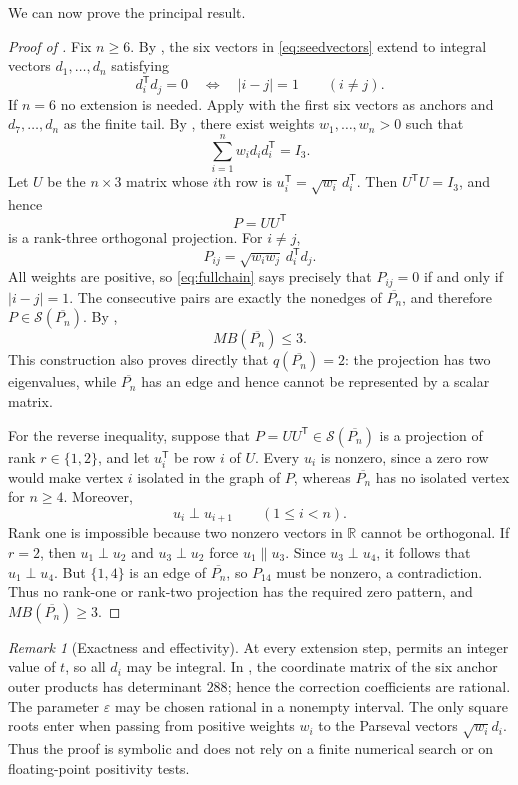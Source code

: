 \documentclass[11pt]{article}
\theoremstyle{remark}
\newtheorem{remark}[theorem]{Remark}
\newcommand{\R}{\mathbb{R}}
\newcommand{\cS}{\mathcal{S}}
\begin{document}
We can now prove the principal result.

\begin{proof}[Proof of ]
Fix $n\ge6$.  By , the six vectors in
\eqref{eq:seedvectors} extend to integral vectors
$d_1,\ldots,d_n$ satisfying
\[
 d_i^{\mathsf T}d_j=0
 \quad\Longleftrightarrow\quad |i-j|=1
 \qquad(i\ne j).
\tag{4.6}\label{eq:fullchain}
\]
If $n=6$ no extension is needed.  Apply  with the first
six vectors as anchors and $d_7,\ldots,d_n$ as the finite tail.  By
, there exist weights $w_1,\ldots,w_n>0$ such that
\[
                 \sum_{i=1}^n w_i d_i d_i^{\mathsf T}=I_3.
\tag{4.7}\label{eq:fullparseval}
\]
Let $U$ be the $n\times3$ matrix whose $i$th row is
$u_i^{\mathsf T}=\sqrt{w_i}\,d_i^{\mathsf T}$.  Then
$U^{\mathsf T}U=I_3$, and hence
\[
                  P=UU^{\mathsf T}
\]
is a rank-three orthogonal projection.  For $i\ne j$,
\[
 P_{ij}=\sqrt{w_iw_j}\,d_i^{\mathsf T}d_j.
\]
All weights are positive, so \eqref{eq:fullchain} says precisely that
$P_{ij}=0$ if and only if $|i-j|=1$.  The consecutive pairs are exactly the
nonedges of $\overline{P_n}$, and therefore
$P\in\cS(\overline{P_n})$.  By ,
\[
                  MB(\overline{P_n})\le3.
\]
This construction also proves directly that $q(\overline{P_n})=2$: the
projection has two eigenvalues, while $\overline{P_n}$ has an edge and hence
cannot be represented by a scalar matrix.

For the reverse inequality, suppose that
$P=UU^{\mathsf T}\in\cS(\overline{P_n})$ is a projection of rank
$r\in\{1,2\}$, and let $u_i^{\mathsf T}$ be row $i$ of $U$.  Every $u_i$ is
nonzero, since a zero row would make vertex $i$ isolated in the graph of
$P$, whereas $\overline{P_n}$ has no isolated vertex for $n\ge4$.  Moreover,
\[
                 u_i\perp u_{i+1}\qquad(1\le i<n).
\tag{4.8}\label{eq:roworth}
\]
Rank one is impossible because two nonzero vectors in $\R$ cannot be
orthogonal.  If $r=2$, then $u_1\perp u_2$ and $u_3\perp u_2$ force
$u_1\parallel u_3$.  Since $u_3\perp u_4$, it follows that
$u_1\perp u_4$.  But $\{1,4\}$ is an edge of $\overline{P_n}$, so
$P_{14}$ must be nonzero, a contradiction.  Thus no rank-one or rank-two
projection has the required zero pattern, and
$MB(\overline{P_n})\ge3$.
\end{proof}

\begin{remark}[Exactness and effectivity]\label{rem:exact}
At every extension step,  permits an integer value of
$t$, so all $d_i$ may be integral.  In , the coordinate
matrix of the six anchor outer products has determinant $288$; hence the
correction coefficients are rational.  The parameter $\varepsilon$ may be
chosen rational in a nonempty interval.  The only square roots enter when
passing from positive weights $w_i$ to the Parseval vectors
$\sqrt{w_i}d_i$.  Thus the proof is symbolic and does not rely on a finite
numerical search or on floating-point positivity tests.
\end{remark}
\end{document}
